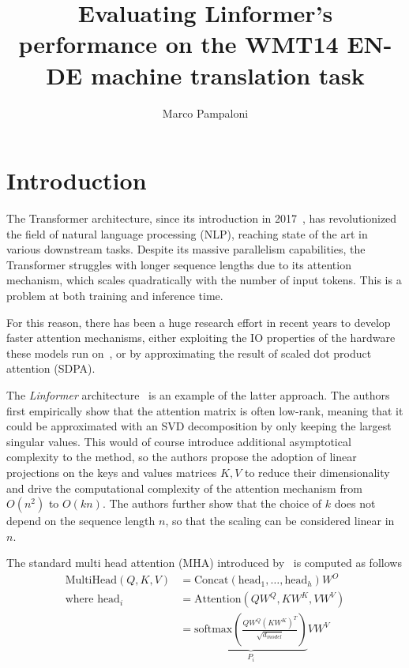 \documentclass[titlepage]{article}
\title{Evaluating Linformer's performance on the WMT14 EN-DE machine
translation task}
\author{Marco Pampaloni}
\affil{Department of Computer Science}
\begin{document}
\maketitle
\tableofcontents
\newpage

\section{Introduction}

The Transformer architecture, since its introduction in
2017~\cite{vaswani2017}, has revolutionized the field of natural language
processing (NLP), reaching state of the art in various downstream tasks.
Despite its massive parallelism capabilities, the Transformer struggles with
longer sequence lengths due to its attention mechanism, which scales
quadratically with the number of input tokens. This is a problem at both
training and inference time.

For this reason, there has been a huge research effort in recent years to
develop faster attention mechanisms, either exploiting the IO properties of the
hardware these models run on~\cite{flashAttention2022}, or by approximating the
result of scaled dot product attention (SDPA).

The \emph{Linformer} architecture~\cite{linformer2020} is an example of the
latter approach. The authors first empirically show that the attention matrix
is often low-rank, meaning that it could be approximated with an SVD
decomposition by only keeping the largest singular values. This
would of course introduce additional asymptotical complexity to the method, so
the authors propose the adoption of linear projections on the keys and values
matrices $K, V$ to reduce their dimensionality and drive the computational
complexity of the attention mechanism from $O(n^2)$ to $O(k n)$.
The authors further show that the choice of $k$ does not depend on the sequence
length $n$, so that the scaling can be considered linear in $n$.

The standard multi head attention (MHA) introduced by~\cite{vaswani2017} is computed as
follows
\begin{equation}
  \begin{aligned}
    \textrm{MultiHead}(Q, K, V) &=
    \textrm{Concat}(\textrm{head}_1, \dots, \textrm{head}_h) W^O \\
    \textrm{where } \textrm{head}_i &=
    \textrm{Attention}(Q W^Q, K W^K, V W^V) \\
    &= \underbrace{
      \textrm{softmax}\left(
        \frac{Q W^Q {(K W^K)}^T}{\sqrt{d_{model}}}
    \right)
  }_{P_i} V W^V \\
  \end{aligned}
\end{equation}
\end{document}
